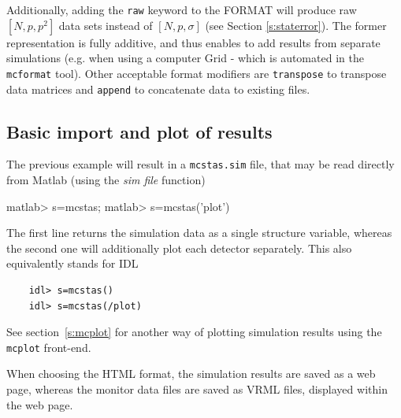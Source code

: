 Additionally, adding the \texttt{raw} keyword to the FORMAT will produce raw
$[N, p, p^2]$ data sets instead of $[N, p, \sigma]$ (see Section
\ref{s:staterror}). The former representation is fully additive, and thus
enables to add results from separate simulations (e.g. when using a computer
Grid - which is automated in the \verb+mcformat+ tool). Other acceptable format
modifiers are \verb+transpose+ to transpose data matrices and \verb+append+ to
concatenate data to existing files.

\subsection{Basic import and plot of results}
\label{s:run-format}
The previous example will result in a \verb+mcstas.sim+ file, that may be read
directly from Matlab (using the \textit{sim file} function)
\begin{matlab}
    matlab> s=mcstas;
    matlab> s=mcstas('plot')
\end{matlab}
The first line returns the simulation data as a single structure variable,
whereas the second one will additionally plot each detector separately.  This
also equivalently stands for IDL 
\begin{lstlisting}
    idl> s=mcstas()
    idl> s=mcstas(/plot)
\end{lstlisting}
See section~\ref{s:mcplot} for another way of plotting simulation results
using the \verb+mcplot+ front-end.

When choosing the HTML format, the simulation results are saved as a web page,
whereas the monitor data files are saved as VRML files, displayed within the web
page.

